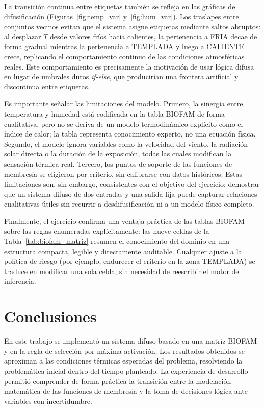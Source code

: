 \documentclass[conference]{IEEEtran}
\begin{document}
La transición continua entre etiquetas también se refleja en las gráficas de difusificación (Figuras~\ref{fig:temp_var} y~\ref{fig:hum_var}). Los traslapes entre conjuntos vecinos evitan que el sistema asigne etiquetas mediante saltos abruptos: al desplazar \(T\) desde valores fríos hacia calientes, la pertenencia a FRIA decae de forma gradual mientras la pertenencia a TEMPLADA y luego a CALIENTE crece, replicando el comportamiento continuo de las condiciones atmosféricas reales. Este comportamiento es precisamente la motivación de usar lógica difusa en lugar de umbrales duros \textit{if-else}, que producirían una frontera artificial y discontinua entre etiquetas.

Es importante señalar las limitaciones del modelo. Primero, la sinergia entre temperatura y humedad está codificada en la tabla BIOFAM de forma cualitativa, pero no se deriva de un modelo termodinámico explícito como el índice de calor; la tabla representa conocimiento experto, no una ecuación física. Segundo, el modelo ignora variables como la velocidad del viento, la radiación solar directa o la duración de la exposición, todas las cuales modifican la sensación térmica real. Tercero, los puntos de soporte de las funciones de membresía se eligieron por criterio, sin calibrarse con datos históricos. Estas limitaciones son, sin embargo, consistentes con el objetivo del ejercicio: demostrar que un sistema difuso de dos entradas y una salida fija puede capturar relaciones cualitativas útiles sin recurrir a desdifusificación ni a un modelo físico completo.

Finalmente, el ejercicio confirma una ventaja práctica de las tablas BIOFAM sobre las reglas enumeradas explícitamente: las nueve celdas de la Tabla~\ref{tab:biofam_matriz} resumen el conocimiento del dominio en una estructura compacta, legible y directamente auditable. Cualquier ajuste a la política de riesgo (por ejemplo, endurecer el criterio en la zona TEMPLADA) se traduce en modificar una sola celda, sin necesidad de reescribir el motor de inferencia.

\section{Conclusiones}
En este trabajo se implementó un sistema difuso basado en una matriz BIOFAM y en la regla de selección por máxima activación. Los resultados obtenidos se aproximan a las condiciones térmicas esperadas del problema, resolviendo la problemática inicial dentro del tiempo planteado. La experiencia de desarrollo permitió comprender de forma práctica la transición entre la modelación matemática de las funciones de membresía y la toma de decisiones lógica ante variables con incertidumbre.
\end{document}
